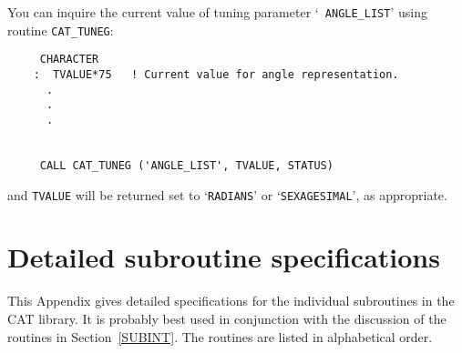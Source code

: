 You can inquire the current value of tuning parameter `{\tt 
ANGLE\_LIST}' using routine {\tt CAT\_TUNEG}:

\begin{verbatim}
     CHARACTER
    :  TVALUE*75   ! Current value for angle representation.
      .
      .
      .


     CALL CAT_TUNEG ('ANGLE_LIST', TVALUE, STATUS)
\end{verbatim}

and {\tt TVALUE} will be returned set to `{\tt RADIANS}' or 
`{\tt SEXAGESIMAL}', as appropriate.


\cleardoublepage
\appendix
\section{\label{DETAIL}Detailed subroutine specifications}

This Appendix gives detailed specifications for the individual 
subroutines in the CAT library.  It is probably best used in conjunction
with the discussion of the routines in Section~\ref{SUBINT}. The 
routines are listed in alphabetical order.

